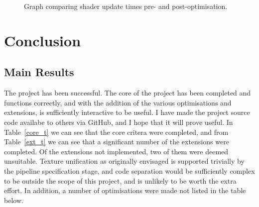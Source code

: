 \documentclass[12pt,twoside,notitlepage]{report}
\begin{document}
\begin{figure}
\centering
{}
\caption{Graph comparing shader update times pre- and post-optimisation.\label{msd-graph}}
\end{figure}

\cleardoublepage
\chapter{Conclusion}

\section{Main Results}
The project has been successful. The core of the project has been completed and functions correctly, and with the addition of the various optimisations and extensions, is sufficiently interactive to be useful. I have made the project source code availabe to others via GitHub, and I hope that it will prove useful. In Table~\ref{core_t} we can see that the core critera were completed, and from Table~\ref{ext_t} we can see that a significant number of the extensions were completed. Of the extensions not implemented, two of them were deemed unsuitable. Texture unification as originally envisaged is supported trivially by the pipeline specification stage, and code separation would be sufficiently complex to be outside the scope of this project, and is unlikely to be worth the extra effort. In addition, a number of optimisations were made not listed in the table below.
\end{document}
